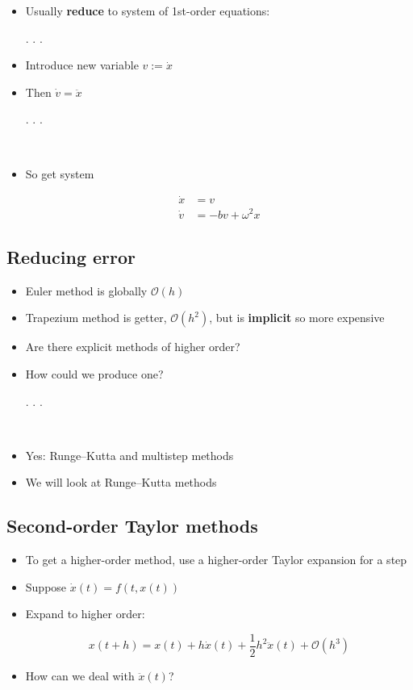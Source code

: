 \documentclass[
]{article}
\begin{document}
\begin{itemize}
\item
  Usually \textbf{reduce} to system of 1st-order equations:

  . . .
\item
  Introduce new variable \(v := \dot{x}\)
\item
  Then \(\dot{v} = \ddot{x}\)

  . . .

  ~\\
\item
  So get system

  \begin{align*}
        \dot{x} &= v \\
        \dot{v} &= -b v + \omega^2 x
    \end{align*}
\end{itemize}

\hypertarget{reducing-error}{%
\subsection{Reducing error}\label{reducing-error}}

\begin{itemize}
\item
  Euler method is globally \(\mathcal{O}(h)\)
\item
  Trapezium method is getter, \(\mathcal{O}(h^2)\), but is
  \textbf{implicit} so more expensive
\item
  Are there explicit methods of higher order?
\item
  How could we produce one?

  . . .

  ~\\
\item
  Yes: Runge--Kutta and multistep methods
\item
  We will look at Runge--Kutta methods
\end{itemize}

\hypertarget{second-order-taylor-methods}{%
\subsection{Second-order Taylor
methods}\label{second-order-taylor-methods}}

\begin{itemize}
\item
  To get a higher-order method, use a higher-order Taylor expansion for
  a step
\item
  Suppose \(\dot{x}(t) = f(t, x(t))\)
\item
  Expand to higher order:

  \[x(t + h) = x(t) + h \dot{x}(t) + \textstyle \frac{1}{2} h^2 \ddot{x}(t) + \mathcal{O}(h^3)\]
\item
  How can we deal with \(\ddot{x}(t)\)?
\end{itemize}
\end{document}
